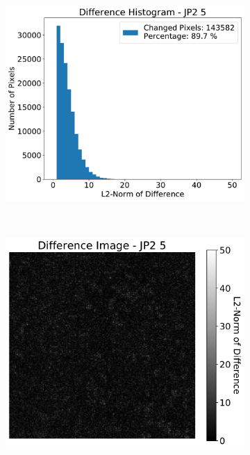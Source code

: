 \begin{figure}[htb]
\begin{subfigure}[b]{0.48\textwidth}
        \includegraphics[width=\textwidth]{doc/thesis/0_figures/compare_quality/set1/jp2_5_center_diff_histogram}
        \caption{}
        \label{fig:img_quality_comp_jp2_5_center_histo}
    \end{subfigure}
    \\
    \begin{subfigure}[b]{0.48\textwidth}
        \centering
        \includegraphics[width=\textwidth]{doc/thesis/0_figures/compare_quality/set1/jp2_5_center_diff_heatmap}

\end{subfigure}
\end{figure}
